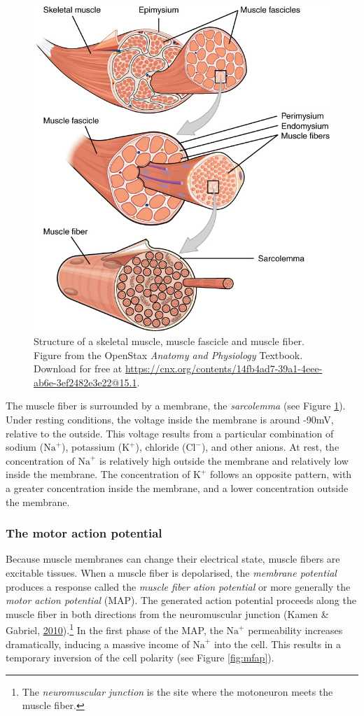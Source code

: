\documentclass[a4paper,12pt,twoside,onecolumn,openright,final,oldfontcommands]{memoir}
\let\rmarkdownfootnote\footnote%
\def\footnote{\protect\rmarkdownfootnote}
\begin{document}
\begin{figure}[ht]

{\centering \includegraphics[width=0.5\linewidth]{assets/muscle} 

}

\caption{Structure of a skeletal muscle, muscle fascicle and muscle fiber. Figure from the OpenStax \textit{Anatomy and Physiology} Textbook. Download for free at \url{https://cnx.org/contents/14fb4ad7-39a1-4eee-ab6e-3ef2482e3e22@15.1}.}\label{fig:muscle}
\end{figure}

The muscle fiber is surrounded by a membrane, the \emph{sarcolemma} (see Figure \ref{fig:muscle}). Under resting conditions, the voltage inside the membrane is around -90mV, relative to the outside. This voltage results from a particular combination of sodium (\(\text{Na}^{+}\)), potassium (\(\text{K}^{+}\)), chloride (\(\text{Cl}^{-}\)), and other anions. At rest, the concentration of \(\text{Na}^{+}\) is relatively high outside the membrane and relatively low inside the membrane. The concentration of \(\text{K}^{+}\) follows an opposite pattern, with a greater concentration inside the membrane, and a lower concentration outside the membrane.

\hypertarget{the-motor-action-potential}{%
\subsubsection{The motor action potential}\label{the-motor-action-potential}}

Because muscle membranes can change their electrical state, muscle fibers are excitable tissues. When a muscle fiber is depolarised, the \emph{membrane potential} produces a response called the \emph{muscle fiber ation potential} or more generally the \emph{motor action potential} (MAP). The generated action potential proceeds along the muscle fiber in both directions from the neuromuscular junction (Kamen \& Gabriel, \protect\hyperlink{ref-kamen_essentials_2010}{2010}).\footnote{The \emph{neuromuscular junction} is the site where the motoneuron meets the muscle fiber.} In the first phase of the MAP, the \(\text{Na}^{+}\) permeability increases dramatically, inducing a massive income of \(\text{Na}^{+}\) into the cell. This results in a temporary inversion of the cell polarity (see Figure \ref{fig:mfap}).
\end{document}
